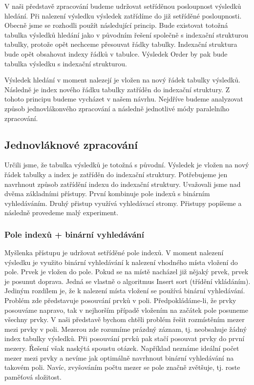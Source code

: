 V naši představě zpracování budeme udržovat setříděnou posloupnost výsledků hledání.
Při nalezení výsledku výsledek zatřídíme do již setříděné posloupnosti.
Obecně jsme se rozhodli použít následující princip.
Bude existovat totožná tabulka výsledků hledání jako v původním řešení společně s indexační strukturou tabulky, protože opět nechceme přesouvat řádky tabulky.
Indexační struktura bude opět obsahovat indexy řádků v tabulce.
Výsledek Order by pak bude tabulka výsledku s indexační strukturou.

Výsledek hledání v moment nalezejí je vložen na nový řádek tabulky výsledků.
Následně je index nového řádku tabulky zatříděn do indexační struktury.
Z tohoto principu budeme vycházet v našem návrhu.
Nejdříve budeme analyzovat způsob jednovlákonvého zpracování a následně jednotlivé módy paralelního zpracování.

\subsection{Jednovláknové zpracování} \label{anal.ordeby.single}

Určili jsme, že tabulka výsledků je totožná s původní.
Výsledek je vložen na nový řádek tabulky a index je zatříděn do indexační struktury.
Potřebujeme jen navrhnout způsob zatřídění indexu do indexační struktury.
Uvažovali jsme nad dvěma základními přístupy.
První kombinuje pole indexů s binárním vyhledáváním.
Druhý přistup využívá vyhledávací stromy.
Přistupy popíšeme a následně provedeme malý experiment.

\subsubsection{Pole indexů + binární vyhledávání}

Myšlenka přístupu je udržovat setříděné pole indexů. 
V moment nalezení výsledku je využito binární vyhledávání \citep[str. 26]{labyrint} k nalezení vhodného místa vložení do pole.
Prvek je vložen do pole.
Pokud se na místě nacházel již nějaký prvek, prvek je posunut doprava.
Jedná se vlastně o algoritmus Insert sort (třídění vkládáním).
Jediným rozdílem je, že k nalezení místa vložení se používá binární vyhledávání.
Problém zde představuje posouvání prvků v poli.
Předpokládáme-li, že prvky posouváme napravo, tak v nejhorším případě vložením na začátek pole posuneme všechny prvky.
V naši představě bychom chtěli problém řešit rozmístěním mezer mezi prvky v poli.
Mezerou zde rozumíme prázdný záznam, tj. neobsahuje žádný index tabulky výsledků.
Při posouvání prvků pak stačí posouvat prvky do první mezery.
Řešení však naskýtá spoustu otázek.
Například neznáme ideální počet mezer mezi prvky a nevíme jak optimálně navrhnout binární vyhledávání na takovém poli.
Navíc, zvyšováním počtu mezer se pole značně zvětšuje, tj. roste paměťová složitost.

